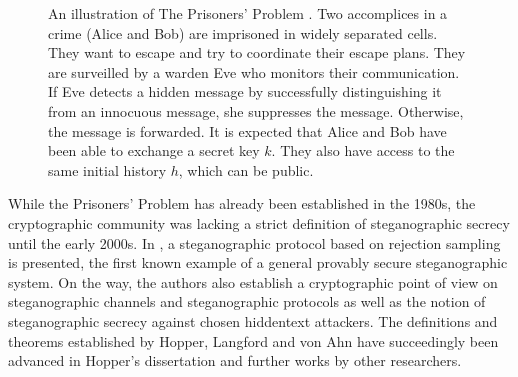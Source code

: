 \begin{figure}[htbp]
\centering
{}
\caption{
An illustration of The Prisoners' Problem \cite{Simmons1983}.
Two accomplices in a crime (Alice and Bob) are imprisoned in widely separated cells.
They want to escape and try to coordinate their escape plans.
They are surveilled by a warden Eve who monitors their communication.
If Eve detects a hidden message by successfully distinguishing it from an innocuous message, she suppresses the message.
Otherwise, the message is forwarded.
It is expected that Alice and Bob have been able to exchange a secret key $k$.
They also have access to the same initial history $h$, which can be public.
}
\label{fig:prisonersgame}
\end{figure}

While the Prisoners' Problem has already been established in the 1980s, the cryptographic community was lacking a strict definition of steganographic secrecy until the early 2000s.
In \cite{HLA2002}, a steganographic protocol based on rejection sampling is presented, the first known example of a general provably secure steganographic system.
On the way, the authors also establish a cryptographic point of view on steganographic channels and steganographic protocols as well as the notion of steganographic secrecy against chosen hiddentext attackers.
The definitions and theorems established by Hopper, Langford and von Ahn have succeedingly been advanced in Hopper's dissertation \cite{Hopper2004} and further works by other researchers.

